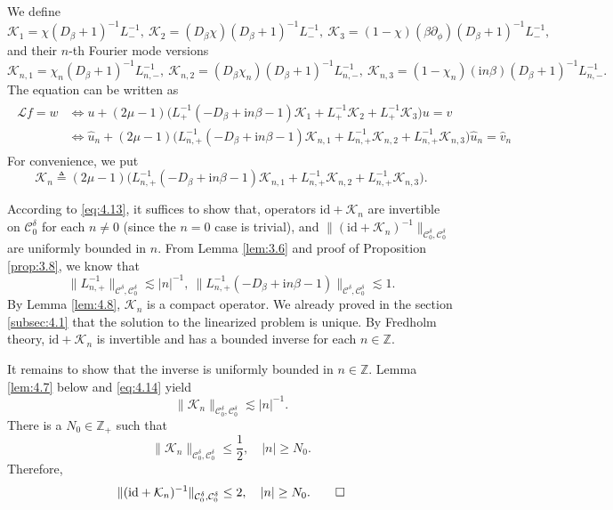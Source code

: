 \documentclass[11pt]{article}
\makeatletter
\renewenvironment{proof}[1][\proofname]{\par
  \vspace{-.7\topsep}%
  \pushQED{\qed}%
  \normalfont
  \topsep0pt \partopsep0pt %
  \trivlist
  \item[\hskip\labelsep
        \itshape
    #1\@addpunct{.}]\ignorespaces
}{%
  \popQED\endtrivlist\@endpefalse
  \addvspace{6pt plus 6pt} %
}
\theoremstyle{definition}
\theoremstyle{remark}
\numberwithin{equation}{section}
\newcommand{\mbb}{\mathbb}
\newcommand{\mcal}{\mathcal}
\renewcommand{\hat}{\widehat}
\newcommand{\Z}{\mbb{Z}}
\newcommand{\del}{\partial}
\newcommand{\norm}[1]{\lVert #1 \rVert}
\makeatother
\begin{document}
We define
\[\mcal{K}_1 = \chi (D_\beta + 1)^{-1} L_-^{-1},~\mcal{K}_2 = (D_\beta \chi) (D_\beta + 1)^{-1} L_-^{-1},~\mcal{K}_3 = (1-\chi) (\beta \del_\phi) (D_\beta + 1)^{-1} L_-^{-1},\]
and their $n$-th Fourier mode versions
\[\mcal{K}_{n,1} = \chi_n (D_\beta + 1)^{-1} L_{n,-}^{-1},~\mcal{K}_{n,2} = (D_\beta \chi_n) (D_\beta + 1)^{-1} L_{n,-}^{-1},~\mcal{K}_{n,3} = (1-\chi_n) (\textrm{i} n\beta) (D_\beta + 1)^{-1} L_{n,-}^{-1}.\]
The equation can be written as
\begin{align} \label{eq:4.13} \begin{split}
	\mcal{L} f = w &\iff u + (2\mu - 1) \Big( L_+^{-1} (-D_\beta + \textrm{i} n\beta - 1) \mcal{K}_1 + L_+^{-1} \mcal{K}_2 + L_+^{-1} \mcal{K}_3 \Big) u = v \\
	&\iff \hat{u}_n + (2\mu - 1) \Big( L_{n,+}^{-1} (-D_\beta + \textrm{i} n\beta - 1) \mcal{K}_{n,1} + L_{n,+}^{-1} \mcal{K}_{n,2} + L_{n,+}^{-1} \mcal{K}_{n,3} \Big) \hat{u}_n = \hat{v}_n
\end{split} \end{align}
For convenience, we put
\[\mcal{K}_n \triangleq (2\mu - 1) \Big( L_{n,+}^{-1} (-D_\beta + \textrm{i} n\beta - 1) \mcal{K}_{n,1} + L_{n,+}^{-1} \mcal{K}_{n,2} +  L_{n,+}^{-1} \mcal{K}_{n,3} \Big).\]
\begin{proof}[Proof of Theorem \ref{thm:4.1}]
According to \eqref{eq:4.13}, it suffices to show that, operators $\text{id} + \mcal{K}_n$ are invertible on $\mcal{C}^\delta_0$ for each $n\neq 0$ (since the $n=0$ case is trivial), and $\norm{(\text{id} + \mcal{K}_n)^{-1}}_{\mcal{C}^\delta_0, \mcal{C}^\delta_0}$ are uniformly bounded in $n$. From Lemma \ref{lem:3.6} and proof of Proposition \ref{prop:3.8}, we know that
\begin{equation} \label{eq:4.14}
\norm{L_{n,+}^{-1}}_{\mcal{C}^\delta, \mcal{C}^\delta_0} \lesssim |n|^{-1}, ~\norm{L_{n,+}^{-1} (-D_\beta + \textrm{i} n\beta - 1)}_{\mcal{C}^\delta, \mcal{C}^\delta_0} \lesssim 1.
\end{equation}
By Lemma \ref{lem:4.8}, $\mcal{K}_n$ is a compact operator. We already proved in the section \ref{subsec:4.1} that the solution to the linearized problem is unique. By Fredholm theory, $\text{id} + \mcal{K}_n$ is invertible and has a bounded inverse for each $n\in \Z$.

It remains to show that the inverse is uniformly bounded in $n\in\Z$. Lemma \ref{lem:4.7} below and \eqref{eq:4.14} yield
\[\norm{\mcal{K}_{n}}_{\mcal{C}^\delta_0, \mcal{C}^\delta_0} \lesssim |n|^{-1}.\]
There is a $N_0 \in \Z_+$ such that 
\[\norm{\mcal{K}_{n}}_{\mcal{C}^\delta_0, \mcal{C}^\delta_0} \leq \frac{1}{2}, \quad |n| \geq  N_0.\]
Therefore,
\[\norm{(\text{id} + \mcal{K}_{n})^{-1}}_{\mcal{C}^\delta_0, \mcal{C}^\delta_0} \leq 2, \quad |n| \geq N_0. \qedhere\]
\end{proof}
\end{document}
